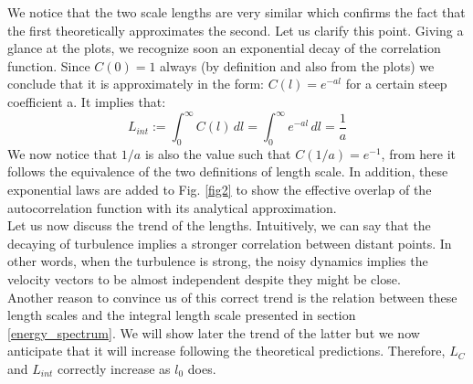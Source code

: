 \documentclass[11pt,titlepage]{article}
\begin{document}
We notice that the two scale lengths are very similar which confirms the fact that the first theoretically approximates the second. Let us clarify this point. Giving a glance at the plots, we recognize soon an exponential decay of the correlation function. Since $C(0)=1$ always (by definition and also from the plots) we conclude that it is approximately in the form: $C(l) = e^{-al}$ for a certain steep coefficient a. It implies that:
\begin{equation*}
	L_{int} := \int_0^{\infty} C(l)\, dl =  \int_0^{\infty} e^{-al}\, dl = \frac{1}{a}
\end{equation*}
We now notice that $1/a$ is also the value such that $C(1/a) = e^{-1}$, from here it follows the equivalence of the two definitions of length scale. In addition, these exponential laws are added to Fig. \ref{fig2} to show the effective overlap of the autocorrelation function with its analytical approximation.\\
Let us now discuss the trend of the lengths. Intuitively, we can say that the decaying of turbulence implies a stronger correlation between distant points. In other words, when the turbulence is strong, the noisy dynamics implies the velocity vectors to be almost independent despite they might be close. \\ 
Another reason to convince us of this correct trend is the relation between these length scales and the integral length scale presented in section \ref{energy_spectrum}. We will show later the trend of the latter but we now anticipate that it will increase following the theoretical predictions. Therefore, $L_C$ and $L_{int}$ correctly increase as $l_0$ does.
\end{document}
